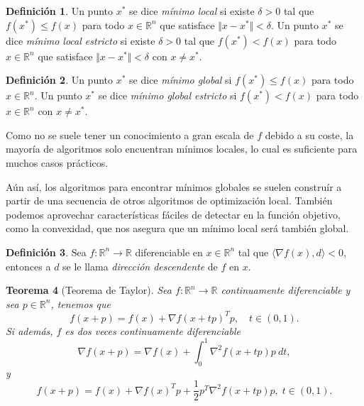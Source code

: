 \documentclass[11pt,a4paper]{book}
\newtheorem{theorem}{Teorema}[chapter]
\theoremstyle{definition}
\newtheorem{definition}[theorem]{Definición}
\theoremstyle{remark}
\begin{document}
\begin{definition}
	Un punto $x^*$ se dice \textit{mínimo local} si existe $\delta > 0$ tal que $f(x^*) \leq f(x)$ para todo $x \in \mathbb{R}^n$ que satisface $\Vert x - x^* \Vert < \delta$.
	Un punto $x^*$ se dice \textit{mínimo local estricto} si existe $\delta > 0$ tal que $f(x^*) < f(x)$ para todo $x \in \mathbb{R}^n$ que satisface $\Vert x - x^* \Vert < \delta$ con $x \neq x^*$.
\end{definition}

\begin{definition}
	Un punto $x^*$ se dice \textit{mínimo global} si $f(x^*) \leq f(x)$ para todo $x \in \mathbb{R}^n$.
	Un punto $x^*$ se dice \textit{mínimo global estricto} si $f(x^*) < f(x)$ para todo $x \in \mathbb{R}^n$ con $x \neq x^*$.
\end{definition}

Como no se suele tener un conocimiento a gran escala de $f$ debido a su coste, la mayoría de algoritmos solo encuentran mínimos locales, lo cual es suficiente para muchos casos prácticos.

Aún así, los algoritmos para encontrar mínimos globales se suelen construír a partir de una secuencia de otros algoritmos de optimización local. También podemos aprovechar características fáciles de detectar en la función objetivo, como la convexidad, que nos asegura que un mínimo local será también global.




\begin{definition}
	Sea $f: \mathbb{R}^n \rightarrow \mathbb{R}$ diferenciable en
$x \in \mathbb{R}^n$ tal que $\langle \nabla f(x), d \rangle < 0$, entonces a $d$ se le llama \textit{dirección descendente} de $f$ en $x$.
\end{definition}

\begin{theorem}[Teorema de Taylor] %
	
	Sea $f: \mathbb{R}^n \rightarrow \mathbb{R}$ continuamente diferenciable y sea $p \in \mathbb{R}^n$, tenemos que 
	\begin{equation}
		f(x+p) = f(x) + \nabla f(x+tp)^Tp, \quad t\in (0,1).
	\end{equation}
	Si además, $f$ es dos veces continuamente diferenciable
	\begin{equation}
		\nabla f(x+p) = \nabla f(x)
		+ \int_0^1 \nabla^2 f(x+tp)p\:dt,
	\end{equation}
	y
	\begin{equation}
		f(x+p) = f(x) + \nabla f(x)^Tp
		+ \frac{1}{2}p^T \nabla^2 f(x+tp)p, \; t\in (0,1).
		\label{eq:thty}
	\end{equation}
\end{theorem}
\end{document}
